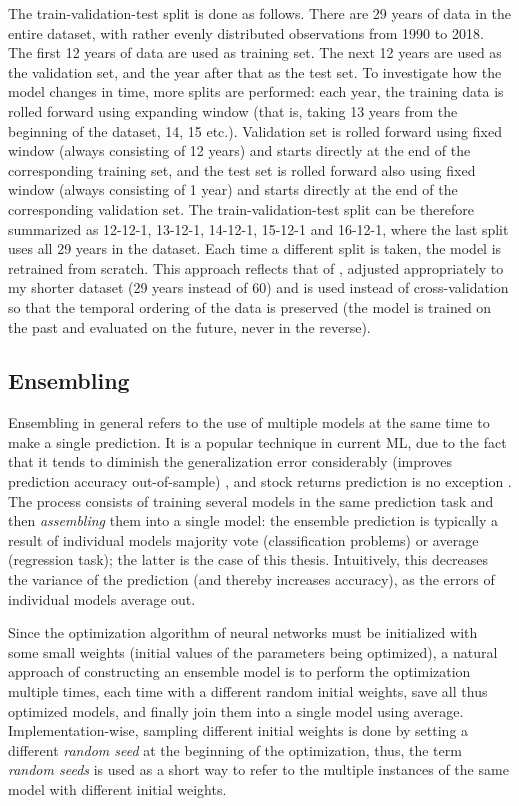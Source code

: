 		The train-validation-test split is done as follows. There are 29 years of data in the entire dataset, with rather evenly distributed observations from 1990 to 2018. The first 12 years of data are used as training set. The next 12 years are used as the validation set, and the year after that as the test set. To investigate how the model changes in time, more splits are performed: each year, the training data is rolled forward using expanding window (that is, taking 13 years from the beginning of the dataset, 14, 15 etc.). Validation set is rolled forward using fixed window (always consisting of 12 years) and starts directly at the end of the corresponding training set, and the test set is rolled forward also using fixed window (always consisting of 1 year) and starts directly at the end of the corresponding validation set. The train-validation-test split can be therefore summarized as 12-12-1, 13-12-1, 14-12-1, 15-12-1 and 16-12-1, where the last split uses all 29 years in the dataset. Each time a different split is taken, the model is retrained from scratch. This approach reflects that of \cite{gu2020empirical}, adjusted appropriately to my shorter dataset (29 years instead of 60) and is used instead of cross-validation so that the temporal ordering of the data is preserved (the model is trained on the past and evaluated on the future, never in the reverse).    
	
	\subsection{Ensembling}
		\label{chap:ensembling}
		Ensembling in general refers to the use of multiple models at the same time to make a single prediction. It is a popular technique in current ML, due to the fact that it tends to diminish the generalization error considerably (improves prediction accuracy out-of-sample) \citep{zhang2012ensemble}, and stock returns prediction is no exception \citep{gu2020empirical}. The process consists of training several models in the same prediction task and then \textit{assembling} them into a single model: the ensemble prediction is typically a result of individual models majority vote (classification problems) or average (regression task); the latter is the case of this thesis. Intuitively, this decreases the variance of the prediction (and thereby increases accuracy), as the errors of individual models average out. 
		
		Since the optimization algorithm of neural networks must be initialized with some small weights (initial values of the parameters being optimized), a natural approach of constructing an ensemble  model is to perform the optimization multiple times, each time with a different random initial weights, save all thus optimized models, and finally join them into a single model using average. Implementation-wise, sampling different initial weights is done by setting a different \textit{random seed} at the beginning of the optimization, thus, the term \textit{random seeds} is used as a short way to refer to the multiple instances of the same model with different initial weights. 
		
